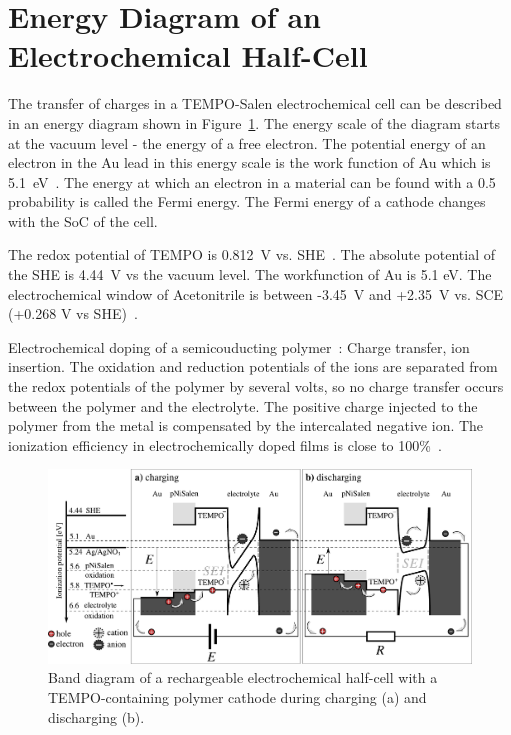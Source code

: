 \section{Energy Diagram of an Electrochemical Half-Cell}
The transfer of charges in a TEMPO-Salen electrochemical cell can be described in an energy diagram shown in Figure~\ref{fig:band_diagram}. The energy scale of the diagram starts at the vacuum level - the energy of a free electron. The potential energy of an electron in the Au lead in this energy scale is the work function of Au which is 5.1~eV~\cite{Eastman1970}.  
The energy at which an electron in a material can be found with a 0.5 probability is called the Fermi energy.
The Fermi energy of a cathode changes with the SoC of the cell.

The redox potential of TEMPO is 0.812~V vs. SHE~\cite{Zhou2020}.
The absolute potential of the SHE is 4.44~V vs the vacuum level.
The workfunction of Au is 5.1 eV.
The electrochemical window of Acetonitrile is between -3.45~V and +2.35~V vs. SCE (+0.268 V vs SHE)~\cite{Luca2015}.

Electrochemical doping of a semicouducting polymer~\cite{Jacobs2022}:
Charge transfer, ion insertion.
The oxidation and reduction potentials of the ions are separated from the redox potentials of the polymer by several volts, so no charge transfer occurs between the polymer and the electrolyte. The positive charge injected to the polymer from the metal is compensated by the intercalated negative ion. The ionization efficiency in electrochemically doped films is close to 100\%~\cite{Jacobs2022}.\\

\begin{figure}[h]
\center
	\includegraphics[width=1\textwidth]{./electrochemistry/figures/band_diagram.pdf}
	\caption{Band diagram of a rechargeable electrochemical half-cell with a TEMPO-containing polymer cathode during charging (a) and discharging (b).}
	\label{fig:band_diagram}
\end{figure}

